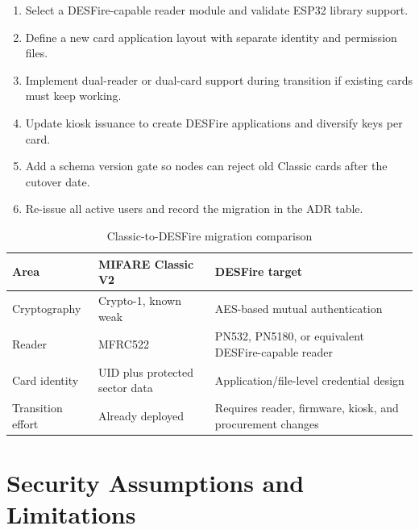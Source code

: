 \begin{enumerate}[leftmargin=1.5em]
    \item Select a DESFire-capable reader module and validate ESP32 library support.
    \item Define a new card application layout with separate identity and permission files.
    \item Implement dual-reader or dual-card support during transition if existing cards must keep working.
    \item Update kiosk issuance to create DESFire applications and diversify keys per card.
    \item Add a schema version gate so nodes can reject old Classic cards after the cutover date.
    \item Re-issue all active users and record the migration in the ADR table.
\end{enumerate}

\begin{table}[H]
\centering
\caption{Classic-to-DESFire migration comparison}
\begin{tabular}{L{4cm}L{4.5cm}L{5cm}}
\toprule
\textbf{Area} & \textbf{MIFARE Classic V2} & \textbf{DESFire target} \\
\midrule
Cryptography & Crypto-1, known weak & AES-based mutual authentication \\
Reader & MFRC522 & PN532, PN5180, or equivalent DESFire-capable reader \\
Card identity & UID plus protected sector data & Application/file-level credential design \\
Transition effort & Already deployed & Requires reader, firmware, kiosk, and procurement changes \\
\bottomrule
\end{tabular}
\end{table}

\section{Security Assumptions and Limitations}

